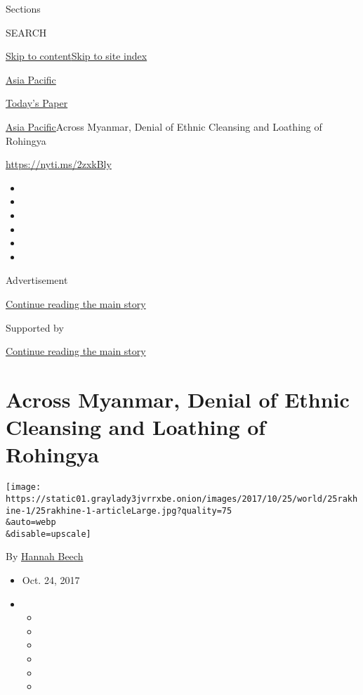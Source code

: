 Sections

SEARCH

\protect\hyperlink{site-content}{Skip to
content}\protect\hyperlink{site-index}{Skip to site index}

\href{https://www.nytimes3xbfgragh.onion/section/world/asia}{Asia
Pacific}

\href{https://myaccount.nytimes3xbfgragh.onion/auth/login?response_type=cookie\&client_id=vi}{}

\href{https://www.nytimes3xbfgragh.onion/section/todayspaper}{Today's
Paper}

\href{/section/world/asia}{Asia Pacific}\textbar{}Across Myanmar, Denial
of Ethnic Cleansing and Loathing of Rohingya

\url{https://nyti.ms/2zxkBly}

\begin{itemize}
\item
\item
\item
\item
\item
\item
\end{itemize}

Advertisement

\protect\hyperlink{after-top}{Continue reading the main story}

Supported by

\protect\hyperlink{after-sponsor}{Continue reading the main story}

\hypertarget{across-myanmar-denial-of-ethnic-cleansing-and-loathing-of-rohingya}{%
\section{Across Myanmar, Denial of Ethnic Cleansing and Loathing of
Rohingya}\label{across-myanmar-denial-of-ethnic-cleansing-and-loathing-of-rohingya}}

\texttt{[image: https://static01.graylady3jvrrxbe.onion/images/2017/10/25/world/25rakhine-1/25rakhine-1-articleLarge.jpg?quality=75\\\&auto=webp\\\&disable=upscale]}

By \href{https://www.nytimes3xbfgragh.onion/by/hannah-beech}{Hannah
Beech}

\begin{itemize}
\item
  Oct. 24, 2017
\item
  \begin{itemize}
  \item
  \item
  \item
  \item
  \item
  \item
  \end{itemize}
\end{itemize}


